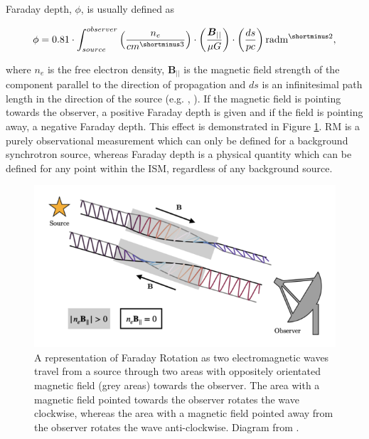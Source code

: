 Faraday depth, $\phi$, is usually defined as 

\begin{equation}
    \phi = 0.81 \cdot \int_{source}^{observer} \left( \frac{n_e}{cm^{\shortminus3}}\right) \cdot \left(\frac{\boldsymbol{B}_{||}}{\mu G}\right) \cdot \left(\frac{ds}{pc}\right) {\rm rad \space m^{\shortminus2}},
    \label{Eq: Faraday depth}
\end{equation}


\noindent where $n_e$ is the free electron density, $\boldsymbol{B_{||}}$ is the magnetic field strength of the component parallel to the direction of propagation and $ds$ is an infinitesimal path length in the direction of the source (e.g. \cite{burn_1966}, \cite{correct_sense_of_faraday_rotation}). If the magnetic field is pointing towards the observer, a positive Faraday depth is given and if the field is pointing away, a negative Faraday depth. This effect is demonstrated in Figure \ref{fig:faraday rotation diagram}. RM is a purely observational measurement which can only be defined for a background synchrotron source, whereas Faraday depth is a physical quantity which can be defined for any point within the ISM, regardless of any background source.


\begin{figure}
    \centering
    \includegraphics[width=0.8\linewidth]{Thesis_Template/Figures/Faraday_rot_diagram.png}
    \caption[Illustration of Faraday Rotation resulting from oppositely directed magnetic fields.]{A representation of Faraday Rotation as two electromagnetic waves travel from a source through two areas with oppositely orientated magnetic field (grey areas) towards the observer. The area with a magnetic field pointed towards the observer rotates the wave clockwise, whereas the area with a magnetic field pointed away from the observer rotates the wave anti-clockwise. Diagram from \cite{Emma_thesis}.}
    \label{fig:faraday rotation diagram}
\end{figure}

